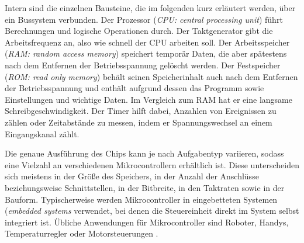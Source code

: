 Intern sind die einzelnen Bausteine, die im folgenden kurz erläutert werden, über ein Bussystem verbunden.
Der Prozessor (\textit{CPU: central processing unit}) führt Berechnungen und logische Operationen durch.
Der Taktgenerator gibt die Arbeitsfrequenz an, also wie schnell der CPU arbeiten soll.
Der Arbeitsspeicher (\textit{RAM: random access memory}) speichert temporär Daten, die aber spätestens nach dem Entfernen der Betriebsspannung gelöscht werden.
Der Festspeicher (\textit{ROM: read only memory}) behält seinen Speicherinhalt auch nach dem Entfernen der Betriebsspannung und enthält aufgrund dessen das Programm sowie Einstellungen und wichtige Daten. Im Vergleich zum RAM hat er eine langsame Schreibgeschwindigkeit. 
Der Timer hilft dabei, Anzahlen von Ereignissen zu zählen oder Zeitabstände zu messen, indem er Spannungswechsel an einem Eingangskanal zählt. 

Die genaue Ausführung des Chips kann je nach Aufgabentyp variieren, sodass eine Vielzahl an verschiedenen Mikrocontrollern erhältlich ist. Diese unterscheiden sich meistens in der Größe des Speichers, in der Anzahl der Anschlüsse beziehungsweise Schnittstellen, in der Bitbreite, in den Taktraten sowie in der Bauform. Typischerweise werden Mikrocontroller in eingebetteten Systemen (\textit{embedded systems} verwendet, bei denen die Steuereinheit direkt im System selbst integriert ist. Übliche Anwendungen für Mikrocontroller sind Roboter, Handys, Temperaturregler oder Motorsteuerungen \cite{Brinkschulte}. 




